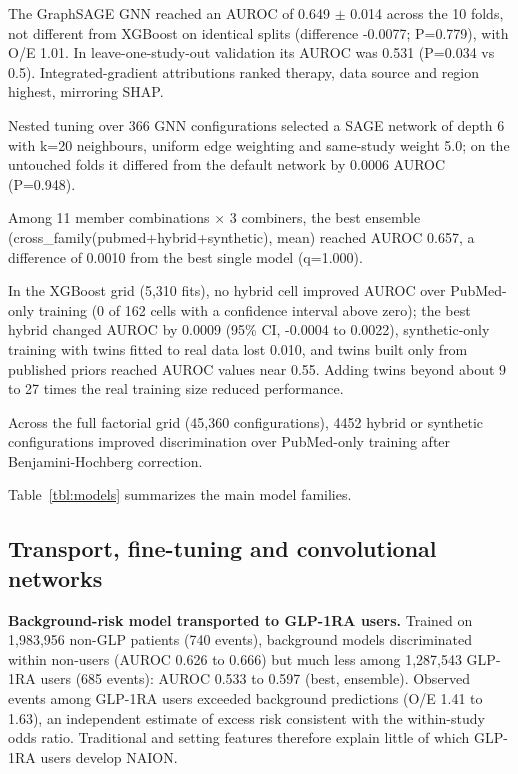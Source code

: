 \documentclass[journal]{IEEEtran}
\begin{document}
The GraphSAGE GNN reached an AUROC of 0.649 \ensuremath{\pm} 0.014 across the 10 folds,
not different from XGBoost on identical splits (difference -0.0077;
P=0.779), with O/E 1.01. In leave-one-study-out validation its AUROC was
0.531 (P=0.034 vs 0.5). Integrated-gradient attributions ranked therapy,
data source and region highest, mirroring SHAP.

Nested tuning over 366 GNN configurations selected a SAGE network of
depth 6 with k=20 neighbours, uniform edge weighting and same-study
weight 5.0; on the untouched folds it differed from the default network
by 0.0006 AUROC (P=0.948).

Among 11 member combinations \ensuremath{\times} 3 combiners, the best ensemble
(cross\_family(pubmed+hybrid+synthetic), mean) reached AUROC 0.657, a
difference of 0.0010 from the best single model (q=1.000).

In the XGBoost grid (5,310 fits), no hybrid cell improved AUROC over
PubMed-only training (0 of 162 cells with a confidence interval above
zero); the best hybrid changed AUROC by 0.0009 (95\% CI, -0.0004 to
0.0022), synthetic-only training with twins fitted to real data lost
0.010, and twins built only from published priors reached AUROC values
near 0.55. Adding twins beyond about 9 to 27 times the real training
size reduced performance.

Across the full factorial grid (45,360 configurations), 4452 hybrid or
synthetic configurations improved discrimination over PubMed-only
training after Benjamini-Hochberg correction.

Table~\ref{tbl:models} summarizes the main model families.

\subsection{Transport, fine-tuning and convolutional
networks}\label{transport-fine-tuning-and-convolutional-networks}

\textbf{Background-risk model transported to GLP-1RA users.} Trained on
1,983,956 non-GLP patients (740 events), background models discriminated
within non-users (AUROC 0.626 to 0.666) but much less among 1,287,543
GLP-1RA users (685 events): AUROC 0.533 to 0.597 (best, ensemble).
Observed events among GLP-1RA users exceeded background predictions (O/E
1.41 to 1.63), an independent estimate of excess risk consistent with
the within-study odds ratio. Traditional and setting features therefore
explain little of which GLP-1RA users develop NAION.
\end{document}
